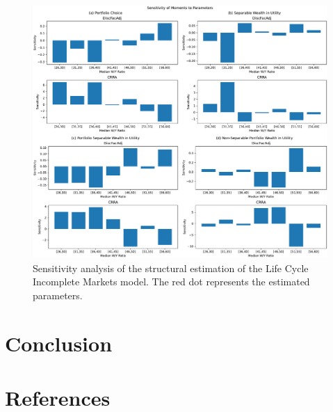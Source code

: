 \documentclass{article}
\begin{document}
\begin{figure}[!htbp]
\centering
\includegraphics[width=0.7\linewidth]{files/AllSensitivity-b20786259ac1e2d0140d556f35d9f50e.pdf}
\caption{Sensitivity analysis of the structural estimation of the Life Cycle Incomplete Markets model. The red dot represents the estimated parameters.}
\label{fig:AllSensitivity}
\end{figure}

\section{Conclusion}\label{Conclusion}

\section{References}\label{References}

\cite{Palumbo_1999}
\cite{Carroll_2000}
\cite{Carroll_1998}
\cite{Michaillat_2021}
\cite{Auclert_2021}
\cite{Mian_2020}
\cite{Kaplan_2018}
\cite{Auclert_2020}
\cite{Cagetti_2003}
\cite{Andrews_2017}
\cite{Attanasio_1999}  





\end{document}
